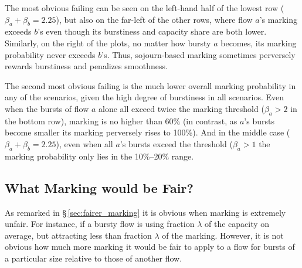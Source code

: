 The most obvious failing can be seen on the left-hand half of the lowest row (\(\beta_a+\beta_b=2.25\)), but also on the far-left of the other rows, where flow \(a\)'s marking exceeds \(b\)'s even though its burstiness and capacity share are both lower.
Similarly, on the right of the plots, no matter how bursty \(a\) becomes, its marking probability never exceeds \(b\)'s. Thus, sojourn-based marking sometimes perversely rewards burstiness and penalizes smoothness.

The second most obvious failing is the much lower overall marking probability in any of the scenarios, given the high degree of burstiness in all scenarios. Even when the bursts of flow \(a\) alone all exceed twice the marking threshold (\(\beta_a>2\) in the bottom row), marking is no higher than 60\% (in contrast, as  \(a\)'s bursts become smaller its marking perversely rises to 100\%). And in the middle case (\(\beta_a+\beta_b=2.25\)), even when all \(a\)'s bursts exceed the threshold (\(\beta_a>1\) the marking probability only lies in the 10\%--20\% range.

\subsection{What Marking would be Fair?}\label{sec:marking_fairness_definition}

As remarked in \S\,\ref{sec:fairer_marking} it is obvious when marking is extremely unfair. For instance, if a bursty flow is using fraction \(\lambda\) of the capacity on average, but attracting less than fraction \(\lambda\) of the marking. However, it is not obvious how much more marking it would be fair to apply to a flow for bursts of a particular size relative to those of another flow.

